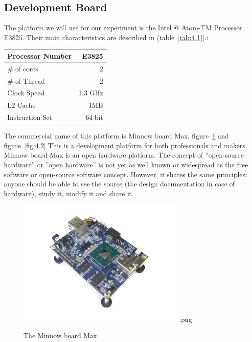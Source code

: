 \subsection{Development Board} The platform we will use for our experiment is the
Intel \makeatletter @  Atom-TM Processor E3825. Their main characteristics are
described in (table~\ref{tab:4.1}).\cite{E3825}:

    \begin{center}
    \begin{tabular}{ | l | r |}
        \hline
        Processor Number & E3825  \\ \hline
        \# of cores & 2  \\ \hline
        \# of Thread & 2  \\ \hline
        Clock Speed & 1.3 GHz  \\ \hline
        L2 Cache & 1MB  \\ \hline
        Instruction Set & 64 bit  \\ \hline
    \end{tabular}
     \label{tab:4.1}
    \end{center}

The commercial name of this platform is Minnow board Max.  figure~\ref{fig:4.1}
and  figure~\ref{fig:4.2} This is a development platform for both
professionals and makers. Minnow board Max is an open hardware platform. The
concept of ''open-source hardware'' or ''open hardware'' is not yet as well
known or widespread as the free software or open-source software concept.
However, it shares the same principles: anyone should be able to see the source
(the design documentation in case of hardware), study it, modify it and share
it.\cite{CERN}

\begin{figure}[H]
\centering
\includegraphics[width=0.75\textwidth]{images/minnow-max.jpg}.png
\caption{The Minnow board Max}
\label{fig:4.1}
\end{figure}


